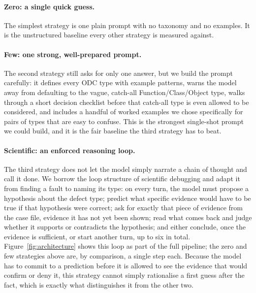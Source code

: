 \paragraph{Zero: a single quick guess.}
The simplest strategy is one plain prompt with no taxonomy and no examples. It is
the unstructured baseline every other strategy is measured against.

\paragraph{Few: one strong, well-prepared prompt.}
The second strategy still asks for only one answer, but we build the prompt
carefully: it defines every ODC type with example patterns, warns the model away
from defaulting to the vague, catch-all Function/Class/Object type, walks
through a short decision checklist before that catch-all type is even allowed
to be considered, and includes a handful of worked examples we chose
specifically for pairs of types that are easy to confuse. This is the strongest
single-shot prompt we could build, and it is the fair baseline the third
strategy has to beat.

\paragraph{Scientific: an enforced reasoning loop.}
The third strategy does not let the model simply narrate a chain of thought and
call it done. We borrow the loop structure of scientific debugging and adapt it
from finding a fault to naming its type: on every turn, the model must propose a
hypothesis about the defect type; predict what specific evidence would have to
be true if that hypothesis were correct; ask for exactly that piece of evidence
from the case file, evidence it has not yet been shown; read what comes back and
judge whether it supports or contradicts the hypothesis; and either conclude,
once the evidence is sufficient, or start another turn, up to six in total.
Figure~\ref{fig:architecture} shows this loop as part of the full
pipeline; the zero and few strategies above are, by comparison, a single step
each. Because the model has to commit to a prediction before it is allowed to
see the evidence that would confirm or deny it, this strategy cannot simply
rationalise a first guess after the fact, which is exactly what distinguishes
it from the other two.


